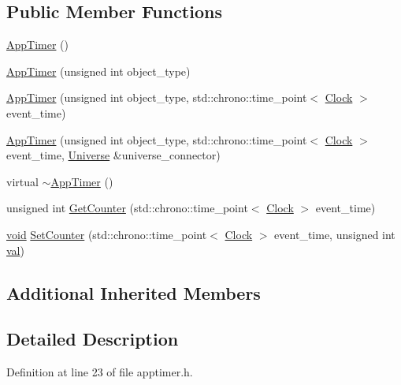 \subsection*{Public Member Functions}
\begin{DoxyCompactItemize}
\item 
\mbox{\hyperlink{class_app_timer_a59bf4eccdc9a3e16745b2cf9a122f935}{App\+Timer}} ()
\item 
\mbox{\hyperlink{class_app_timer_a06df15e33135f60f661c231e067951f3}{App\+Timer}} (unsigned int object\+\_\+type)
\item 
\mbox{\hyperlink{class_app_timer_a192075895ca575e9acb2663f3ebcecd6}{App\+Timer}} (unsigned int object\+\_\+type, std\+::chrono\+::time\+\_\+point$<$ \mbox{\hyperlink{universe_8h_a0ef8d951d1ca5ab3cfaf7ab4c7a6fd80}{Clock}} $>$ event\+\_\+time)
\item 
\mbox{\hyperlink{class_app_timer_af0836d131aa78b6812930199a5c7f9bd}{App\+Timer}} (unsigned int object\+\_\+type, std\+::chrono\+::time\+\_\+point$<$ \mbox{\hyperlink{universe_8h_a0ef8d951d1ca5ab3cfaf7ab4c7a6fd80}{Clock}} $>$ event\+\_\+time, \mbox{\hyperlink{class_universe}{Universe}} \&universe\+\_\+connector)
\item 
virtual \mbox{\hyperlink{class_app_timer_a5ef0c072a0591cf5a3bcc07edbd3577f}{$\sim$\+App\+Timer}} ()
\item 
unsigned int \mbox{\hyperlink{class_app_timer_ab9bb2b5f283b02d6d2292e064ddbd2ab}{Get\+Counter}} (std\+::chrono\+::time\+\_\+point$<$ \mbox{\hyperlink{universe_8h_a0ef8d951d1ca5ab3cfaf7ab4c7a6fd80}{Clock}} $>$ event\+\_\+time)
\item 
\mbox{\hyperlink{glad_8h_a950fc91edb4504f62f1c577bf4727c29}{void}} \mbox{\hyperlink{class_app_timer_a77d5d447d6b136a35304b0571a166ddc}{Set\+Counter}} (std\+::chrono\+::time\+\_\+point$<$ \mbox{\hyperlink{universe_8h_a0ef8d951d1ca5ab3cfaf7ab4c7a6fd80}{Clock}} $>$ event\+\_\+time, unsigned int \mbox{\hyperlink{glad_8h_a26942fd2ed566ef553eae82d2c109c8f}{val}})
\end{DoxyCompactItemize}
\subsection*{Additional Inherited Members}


\subsection{Detailed Description}


Definition at line 23 of file apptimer.\+h.




